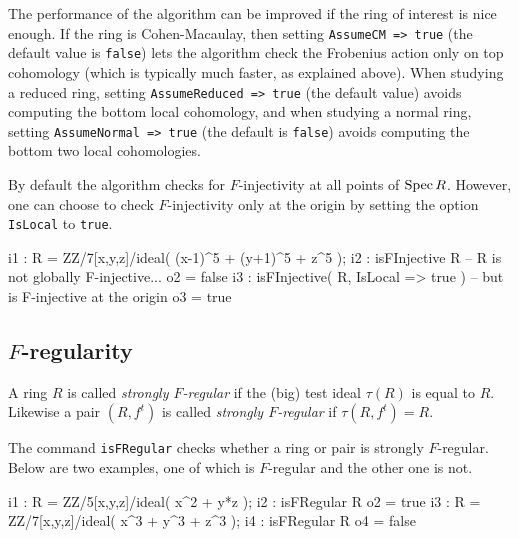 \documentclass{amsart}
\begin{document}
The performance of the algorithm can be improved if the ring of interest is
nice enough. If the ring is Cohen-Macaulay, then setting \texttt{AssumeCM =>
true} (the default value is \texttt{false}) lets the algorithm check the Frobenius action only on top cohomology
(which is typically much faster, as explained above).
When studying a reduced ring,  setting \texttt{AssumeReduced => true} (the default value) avoids
computing the bottom local cohomology, and when studying a normal ring, setting
\texttt{AssumeNormal => true} (the default is \texttt{false}) avoids computing the bottom two local
cohomologies.

By default the algorithm checks for $F$-injectivity at all points of $\operatorname{{Spec}} R$.  However, one
can choose to check $F$-injectivity only at the origin by setting the
option \texttt{IsLocal} to  \texttt{true}.

\medskip
{\small
\begin{MyVerbatim}
i1 : R = ZZ/7[x,y,z]/ideal( (x-1)^5 + (y+1)^5 + z^5 );
i2 : isFInjective R -- R is not globally F-injective...
o2 = false
i3 : isFInjective( R, IsLocal => true ) -- but is F-injective at the origin
o3 = true
\end{MyVerbatim}
}\medskip

\subsection{$F$-regularity}

\begin{definition}
A ring $R$ is called \emph{strongly $F$-regular} if the (big) test ideal $\tau(R)$ is equal to $R$.  Likewise a pair $(R, f^t)$ is called \emph{strongly $F$-regular} if $\tau(R, f^t) = R$.
\end{definition}


The command \texttt{isFRegular} checks whether a ring or pair is strongly
$F$-regular. Below are two examples, one of which is $F$-regular and the other one is not.


\medskip
{\small
\begin{MyVerbatim}
i1 : R = ZZ/5[x,y,z]/ideal( x^2 + y*z );
i2 : isFRegular R
o2 = true
i3 : R = ZZ/7[x,y,z]/ideal( x^3 + y^3 + z^3 );
i4 : isFRegular R
o4 = false
\end{MyVerbatim}
}\medskip
\end{document}
